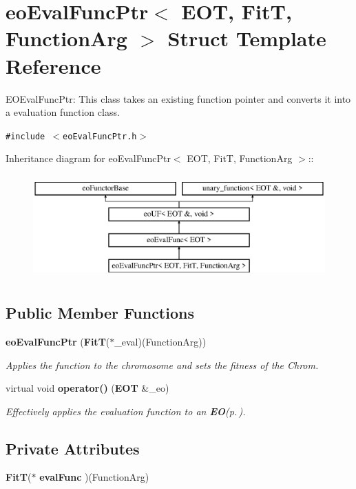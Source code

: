 \section{eo\-Eval\-Func\-Ptr$<$ EOT, Fit\-T, Function\-Arg $>$ Struct Template Reference}
\label{structeo_eval_func_ptr}
EOEval\-Func\-Ptr: This class takes an existing function pointer and converts it into a evaluation function class.  


{\tt \#include $<$eo\-Eval\-Func\-Ptr.h$>$}

Inheritance diagram for eo\-Eval\-Func\-Ptr$<$ EOT, Fit\-T, Function\-Arg $>$::\begin{figure}[H]
\begin{center}
\leavevmode
\includegraphics[height=4cm]{structeo_eval_func_ptr}
\end{center}
\end{figure}
\subsection*{Public Member Functions}
\begin{CompactItemize}
\item 
{\bf eo\-Eval\-Func\-Ptr} ({\bf Fit\-T}($\ast$\_\-eval)(Function\-Arg))
\begin{CompactList}\small\item\em Applies the function to the chromosome and sets the fitness of the Chrom. \item\end{CompactList}\item 
virtual void {\bf operator()} ({\bf EOT} \&\_\-eo)\label{structeo_eval_func_ptr_a1}

\begin{CompactList}\small\item\em Effectively applies the evaluation function to an {\bf EO}{\rm (p.\,\pageref{class_e_o})}. \item\end{CompactList}\end{CompactItemize}
\subsection*{Private Attributes}
\begin{CompactItemize}
\item 
{\bf Fit\-T}($\ast$ {\bf eval\-Func} )(Function\-Arg)\label{structeo_eval_func_ptr_r0}

\end{CompactItemize}


